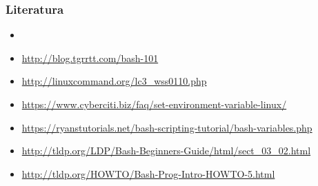 \documentclass{beamer}
\begin{document}
\begin{frame}
\frametitle{Literatura}
\begin{itemize}
	\item[]
	\item[] \small\url{http://blog.tgrrtt.com/bash-101}
	\item[] \small\url{http://linuxcommand.org/lc3_wss0110.php}
	\item[] \small\url{https://www.cyberciti.biz/faq/set-environment-variable-linux/}
	\item[] \small\url{https://ryanstutorials.net/bash-scripting-tutorial/bash-variables.php}
	\item[] \small\url{http://tldp.org/LDP/Bash-Beginners-Guide/html/sect_03_02.html} 
	\item[] \small\url{http://tldp.org/HOWTO/Bash-Prog-Intro-HOWTO-5.html}
\end{itemize}
\end{frame}
\end{document}
